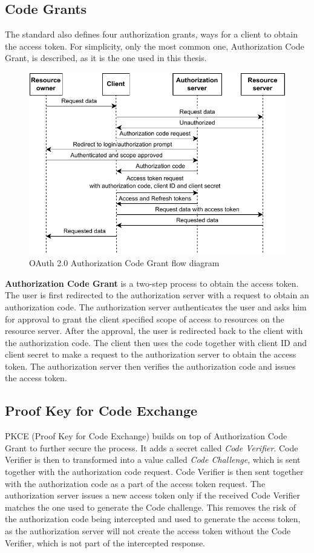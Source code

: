 \subsection*{Code Grants}
\label{section:code_grants}
The standard also defines four authorization grants, ways for a client to obtain the access token. For simplicity, only the most common one, Authorization Code Grant, is described, as it is the one used in this thesis.

\begin{figure}[hbt]
  \centering
  \includegraphics[width=.8 \linewidth]{figures/auth-sequence-auth-code.pdf}
  \caption{OAuth 2.0 Authorization Code Grant flow diagram}
  \label{fig:oauth2_auth_code_grant}
\end{figure}

\textbf{Authorization Code Grant} is a two-step process to obtain the access token. The user is first redirected to the authorization server with a request to obtain an authorization code. The authorization server authenticates the user and asks him for approval to grant the client specified scope of access to resources on the resource server. After the approval, the user is redirected back to the client with the authorization code. The client then uses the code together with client ID and client secret to make a request to the authorization server to obtain the access token. The authorization server then verifies the authorization code and issues the access token.

\subsection*{Proof Key for Code Exchange}
PKCE (Proof Key for Code Exchange) \cite{pkce_rfc} builds on top of Authorization Code Grant to further secure the process. It adds a secret called \emph{Code Verifier}. Code Verifier is then to transformed into a value called \emph{Code Challenge}, which is sent together with the authorization code request. Code Verifier is then sent together with the authorization code as a part of the access token request. The authorization server issues a new access token only if the received Code Verifier matches the one used to generate the Code challenge. This removes the risk of the authorization code being intercepted and used to generate the access token, as the authorization server will not create the access token without the Code Verifier, which is not part of the intercepted response.

